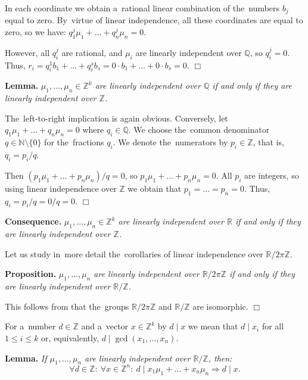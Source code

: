 \documentclass[twoside]{article}
\begin{document}
    In each coordinate we obtain a~rational linear combination of the~numbers $b_j$ equal to zero.
    By~virtue of linear independence, all these coordinates are equal to zero, so we have:
    $q_1^j \mu_1 + \ldots + q_n^j \mu_n = 0$.

    However, all $q_i^j$ are rational, and $\mu_i$ are linearly independent over $\mathbb{Q}$, so $q_i^j = 0$.
    Thus, $r_i = q_i^1 b_1 + \ldots + q_i^s b_s = 0 \cdot b_1 + \ldots + 0 \cdot b_s = 0$.
\hfill$\Box$\medskip

\medskip\noindent\textbf{Lemma.}\emph{
    $\mu_1, \ldots, \mu_n \in \mathbb{Z}^k$ are linearly independent over $\mathbb{Q}$ if and only if they are linearly independent over $\mathbb{Z}$.
}\medskip

    The~left-to-right implication is again obvious. Conversely, let $q_1 \mu_1 + \ldots + q_n \mu_n = 0$ where $q_i \in \mathbb{Q}$.
    We choose the~common denominator $q \in \mathbb{N} \setminus \{ 0 \}$ for the~fractions $q_i$.
    We denote the~numerators by $p_i \in \mathbb{Z}$, that is, $q_i = p_i / q$.

    Then $(p_1 \mu_1 + \ldots + p_n \mu_n) / q = 0$, so $p_1 \mu_1 + \ldots + p_n \mu_n = 0$.
    All $p_i$ are integers, so using linear independence over $\mathbb{Z}$ we obtain that $p_1 = \ldots = p_n = 0$.
    Thus, $q_i = p_i / q = 0 / q = 0$.
\hfill$\Box$\medskip

\medskip\noindent\textbf{Consequence.}\emph{
    $\mu_1, \ldots, \mu_n \in \mathbb{Z}^k$ are linearly independent over $\mathbb{R}$ if and only if they are linearly independent over $\mathbb{Z}$.
}\medskip

Let us study in~more detail the~corollaries of linear independence over $\mathbb{R} / 2 \pi \mathbb{Z}$.

\medskip\noindent\textbf{Proposition.}\emph{
    $\mu_1, \ldots, \mu_n$ are linearly independent over $\mathbb{R} / 2 \pi \mathbb{Z}$
    if and only if they are linearly independent over $\mathbb{R} / \mathbb{Z}$.
}\medskip

    This follows from that the~groups $\mathbb{R} / 2 \pi \mathbb{Z}$ and $\mathbb{R} / \mathbb{Z}$ are isomorphic.
\hfill$\Box$\medskip

For a~number $d \in \mathbb{Z}$ and a~vector $x \in \mathbb{Z}^k$ by $d \mid x$ we mean that $d \mid x_i$ for all $1 \leq i \leq k$
or, equivalently, $d \mid \gcd(x_1, \ldots, x_n)$.

\medskip\noindent\textbf{Lemma.}\emph{
    If $\mu_1, \ldots, \mu_n$ are linearly independent over $\mathbb{R} / \mathbb{Z}$, then:
    $$
        \forall d \in \mathbb{Z}{:}\ \forall x \in \mathbb{Z}^n{:}\ d \mid x_1 \mu_1 + \ldots + x_n \mu_n \Rightarrow d \mid x.
    $$
}
\end{document}
